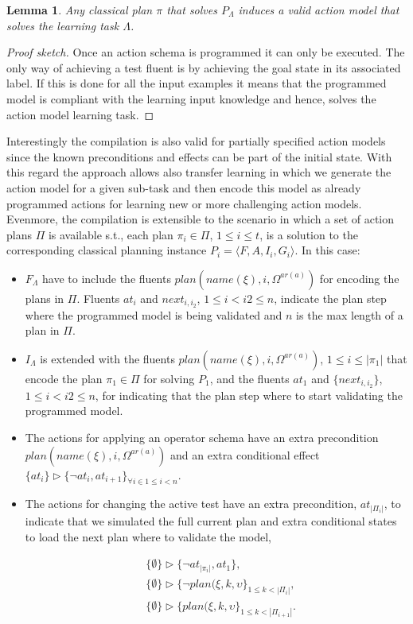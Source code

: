 \documentclass[letterpaper]{article} %
\newcommand{\tup}[1]{{\langle #1 \rangle}}
\newtheorem{lemma}[theorem]{Lemma}
\begin{document}
\begin{lemma}
Any classical plan $\pi$ that solves $P_{\Lambda}$ induces a valid action model that solves the learning task $\Lambda$.
\end{lemma}

\begin{proof}[Proof sketch]
Once an action schema is programmed it can only be executed. The only way of achieving a test fluent is by achieving the goal state in its associated label. If this is done for all the input examples it means that the programmed model is compliant with the learning input knowledge and hence, solves the action model learning task.
\end{proof}

Interestingly the compilation is also valid for partially specified action models since the known preconditions and effects can be part of the initial state. With this regard the approach allows also transfer learning in which we generate the action model for a given sub-task and then encode this model as already programmed actions for learning new or more challenging action models. Evenmore, the compilation is extensible to the scenario in which a set of action plans $\Pi$ is available s.t., each plan $\pi_i\in \Pi$, {\small $1\leq i\leq t$}, is a solution to the corresponding classical planning instance $P_i=\tup{F,A,I_i,G_i}$. In this case:
\begin{itemize}
\item $F_{\Lambda}$ have to include the fluents $plan(name(\xi),i,\Omega^{ar(a)})$ for encoding the plans in $\Pi$. Fluents $at_i$ and $next_{i,i_2}$, {\small $1\leq i<i2\leq n$}, indicate the plan step where the programmed model is being validated and $n$ is the max length of a plan in $\Pi$.
\item $I_{\Lambda}$ is extended with the fluents $plan(name(\xi),i,\Omega^{ar(a)})$, {\small $1\leq i\leq |\pi_1|$} that encode the plan $\pi_1\in \Pi$ for solving $P_1$, and the fluents $at_1$ and $\{next_{i,i_2}\}$, {\small $1\leq i<i2\leq n$}, for indicating that the plan step where to start validating the programmed model.
\item The actions for applying an operator schema have an extra precondition $plan(name(\xi),i,\Omega^{ar(a)})$ and an extra conditional effect $\{at_{i}\}\rhd\{\neg at_{i},at_{i+1}\}_{\forall i\in 1\leq i< n}$.
\item The actions for changing the active test have an extra precondition, $at_{|\Pi_i|}$, to indicate that we simulated the full current plan and extra conditional states to load the next plan where to validate the model,
\begin{small}
\begin{align*}
&\{\emptyset\}\rhd\{\neg at_{|\pi_i|},at_1\},\\
&\{\emptyset\}\rhd\{\neg plan(\xi,k,\upsilon\}_{1\leq k<|\Pi_i|},\\
&\{\emptyset\}\rhd\{plan(\xi,k,\upsilon\}_{1\leq k<|\Pi_{i+1}|}.
\end{align*}
\end{small}
\end{itemize}
\end{document}
